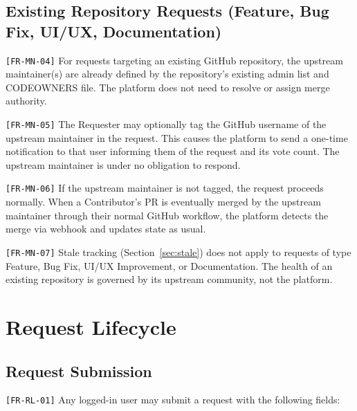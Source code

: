 \documentclass[12pt,a4paper]{article}
\begin{document}
\subsection{Existing Repository Requests (Feature, Bug Fix, UI/UX, Documentation)}
\texttt{[FR-MN-04]} For requests targeting an existing GitHub repository, the upstream maintainer(s) are already defined by the repository's existing admin list and CODEOWNERS file. The platform does not need to resolve or assign merge authority.

\texttt{[FR-MN-05]} The Requester may optionally tag the GitHub username of the upstream maintainer in the request. This causes the platform to send a one-time notification to that user informing them of the request and its vote count. The upstream maintainer is under no obligation to respond.

\texttt{[FR-MN-06]} If the upstream maintainer is not tagged, the request proceeds normally. When a Contributor's PR is eventually merged by the upstream maintainer through their normal GitHub workflow, the platform detects the merge via webhook and updates state as usual.

\texttt{[FR-MN-07]} Stale tracking (Section~\ref{sec:stale}) does not apply to requests of type Feature, Bug Fix, UI/UX Improvement, or Documentation. The health of an existing repository is governed by its upstream community, not the platform.

\section{Request Lifecycle}

\subsection{Request Submission}
\texttt{[FR-RL-01]} Any logged-in user may submit a request with the following fields:
\end{document}
